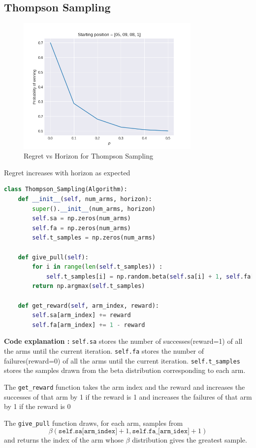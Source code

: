 \documentclass[11pt]{article}
\begin{document}
\subsection*{Thompson Sampling}
 \begin{figure}[H]
    \begin{center}
        \includegraphics[width=0.8\textwidth]{../images/plot1.png}
        \caption{Regret vs Horizon for Thompson Sampling}
    \end{center}
 \end{figure}
 Regret increases with horizon as expected 

 \begin{lstlisting}[language=Python]      
    class Thompson_Sampling(Algorithm):
    def __init__(self, num_arms, horizon):
        super().__init__(num_arms, horizon)
        self.sa = np.zeros(num_arms)
        self.fa = np.zeros(num_arms)
        self.t_samples = np.zeros(num_arms)
    
    def give_pull(self):
        for i in range(len(self.t_samples)) :
            self.t_samples[i] = np.random.beta(self.sa[i] + 1, self.fa[i] + 1)
        return np.argmax(self.t_samples)
    
    def get_reward(self, arm_index, reward):
        self.sa[arm_index] += reward
        self.fa[arm_index] += 1 - reward        \end{lstlisting}
    
\noindent
\textbf{Code explanation :} \texttt{self.sa} stores the number of successes(reward=1) of 
all the arms until the current iteration. \texttt{self.fa} stores the number of failures(reward=0) of 
all the arms until the current iteration. \texttt{self.t\_samples} stores 
the samples drawn from the beta distribution corresponding to each arm. 

\noindent The \texttt{get\_reward} function takes the arm index and the reward and increases the successes of
that arm by 1 if the reward is 1 and increases the failures of that arm by 1 if the reward is 0

\noindent The \texttt{give\_pull} function draws, for each arm, samples from 
$$\beta(\texttt{self.sa[arm\_index]}+1,\texttt{self.fa\_[arm\_idex]}+1)$$
and returns the index of the arm whose $\beta$ distribution gives the greatest sample.
\end{document}
